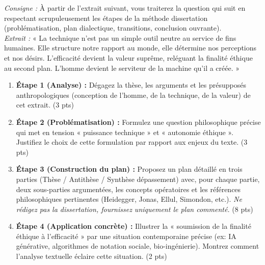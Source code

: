 \documentclass[11pt]{article}
\begin{document}
\begin{exercice}
\textit{Consigne :} À partir de l'extrait suivant, vous traiterez la question qui suit en respectant scrupuleusement les étapes de la méthode dissertation (problématisation, plan dialectique, transitions, conclusion ouvrante). \\
\textit{Extrait :} « La technique n'est pas un simple outil neutre au service de fins humaines. Elle structure notre rapport au monde, elle détermine nos perceptions et nos désirs. L'efficacité devient la valeur suprême, reléguant la finalité éthique au second plan. L'homme devient le serviteur de la machine qu'il a créée. » \\
\begin{enumerate}
    \item \textbf{Étape 1 (Analyse) :} Dégagez la thèse, les arguments et les présupposés anthropologiques (conception de l'homme, de la technique, de la valeur) de cet extrait. (3 pts)
    \item \textbf{Étape 2 (Problématisation) :} Formulez une question philosophique précise qui met en tension « puissance technique » et « autonomie éthique ». Justifiez le choix de cette formulation par rapport aux enjeux du texte. (3 pts)
    \item \textbf{Étape 3 (Construction du plan) :} Proposez un plan détaillé en trois parties (Thèse / Antithèse / Synthèse dépassement) avec, pour chaque partie, deux sous-parties argumentées, les concepts opératoires et les références philosophiques pertinentes (Heidegger, Jonas, Ellul, Simondon, etc.). \textit{Ne rédigez pas la dissertation, fournissez uniquement le plan commenté.} (8 pts)
    \item \textbf{Étape 4 (Application concrète) :} Illustrer la « soumission de la finalité éthique à l'efficacité » par une situation contemporaine précise (ex: IA générative, algorithmes de notation sociale, bio-ingénierie). Montrez comment l'analyse textuelle éclaire cette situation. (2 pts)
\end{enumerate}
\end{exercice}
\end{document}
